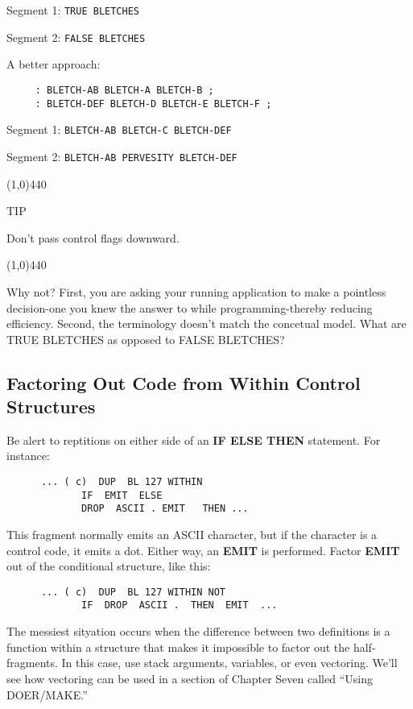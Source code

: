 \documentclass{book}
\begin{document}
\noindent 
Segment 1:	\texttt{TRUE BLETCHES}

\noindent
Segment 2:	\texttt{FALSE BLETCHES}

\bigskip

\noindent 
A better approach:

\begin{verbatim}
     : BLETCH-AB BLETCH-A BLETCH-B ;
     : BLETCH-DEF BLETCH-D BLETCH-E BLETCH-F ;
\end{verbatim}

\indent Segment 1:	\texttt{BLETCH-AB BLETCH-C BLETCH-DEF}

\indent Segment 2:	\texttt{BLETCH-AB PERVESITY BLETCH-DEF}

\line(1,0){440}

TIP

Don't pass control flags downward.

\line(1,0){440}

\bigskip

\noindent
Why not? First, you are asking your running application to make a pointless decision-one you knew the answer to while programming-thereby reducing efficiency. Second, the terminology doesn't match the concetual model. What are TRUE BLETCHES as opposed to FALSE BLETCHES?

\subsection*{
	\textbf{Factoring Out Code from Within Control Structures}}

Be alert to reptitions on either side of an \textbf{IF ELSE THEN} statement. For instance:

\begin{verbatim}
      ... ( c)  DUP  BL 127 WITHIN
             IF  EMIT  ELSE
             DROP  ASCII . EMIT   THEN ...
\end{verbatim}

\noindent
This fragment normally emits an ASCII character, but if the character is a control code, it emits a dot. Either way, an \textbf{EMIT} is performed. Factor \textbf{EMIT} out of the conditional structure, like this:

\begin{verbatim}
      ... ( c)  DUP  BL 127 WITHIN NOT
             IF  DROP  ASCII .  THEN  EMIT  ...
\end{verbatim}

\noindent
The messiest sityation occurs when the difference between two definitions is a function within a structure that makes it impossible to factor out the half-fragments. In this case, use stack arguments, variables, or even vectoring. We'll see how vectoring can be used in a section of Chapter Seven called ``Using DOER/MAKE.''
\end{document}
